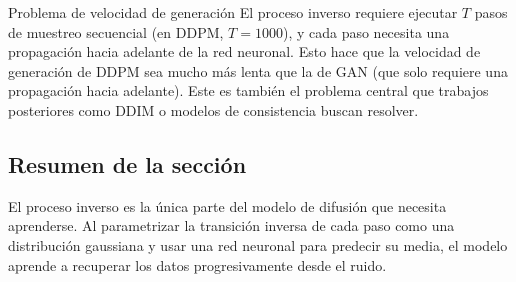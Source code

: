 \begin{warningbox}{Problema de velocidad de generación}
El proceso inverso requiere ejecutar $T$ pasos de muestreo secuencial (en DDPM, $T = 1000$), y cada paso necesita una propagación hacia adelante de la red neuronal. Esto hace que la velocidad de generación de DDPM sea mucho más lenta que la de GAN (que solo requiere una propagación hacia adelante). Este es también el problema central que trabajos posteriores como DDIM o modelos de consistencia buscan resolver.
\end{warningbox}

\subsection{Resumen de la sección}

El proceso inverso es la única parte del modelo de difusión que necesita aprenderse. Al parametrizar la transición inversa de cada paso como una distribución gaussiana y usar una red neuronal para predecir su media, el modelo aprende a recuperar los datos progresivamente desde el ruido.


